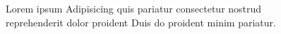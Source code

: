 \documentclass[aps, prc, twocolumn, reprint]{revtex4-1}
\begin{document}
\begin{figure}
	\caption{Lorem ipsum Adipisicing quis pariatur consectetur nostrud reprehenderit dolor proident Duis do proident minim pariatur.}
	\label{fig:fits}
\end{figure}


\end{document}
